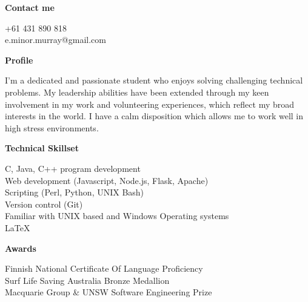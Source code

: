 \documentclass{article}
\newcommand{\mytitle}[1]{{\Large\textbf{#1}} \vspace{0.2cm}}
\begin{document}
\begin{minipage}[t]{0.25\linewidth}
    \vspace{0.2cm}
    {
        \mytitle{Contact me}

        +61 431 890 818 \\
        e.minor.murray@gmail.com \\
    }

    \vspace{1cm}

    {
        \mytitle{Profile}

        I'm a dedicated and passionate student who enjoys solving challenging technical problems.
        My leadership abilities have been extended through my keen involvement in my work and volunteering experiences, which reflect my broad interests in the world.
        I have a calm disposition which allows me to work well in high stress environments. \\
    }

    \vspace{0.3cm}

    {
        \mytitle{Technical Skillset}

        C, Java, C++ program development \\ 

        Web development (Javascript, Node.js, Flask, Apache) \\

        Scripting (Perl, Python, UNIX Bash) \\

        Version control (Git) \\

        Familiar with UNIX based and Windows Operating systems \\

        {\large \LaTeX}
    }

    \vspace{0.5cm}

    {
        \mytitle{Awards}

        Finnish National Certificate Of Language Proficiency \\

        Surf Life Saving Australia Bronze Medallion \\

        Macquarie Group \& UNSW Software Engineering Prize 
    }


\end{minipage}
\end{document}
